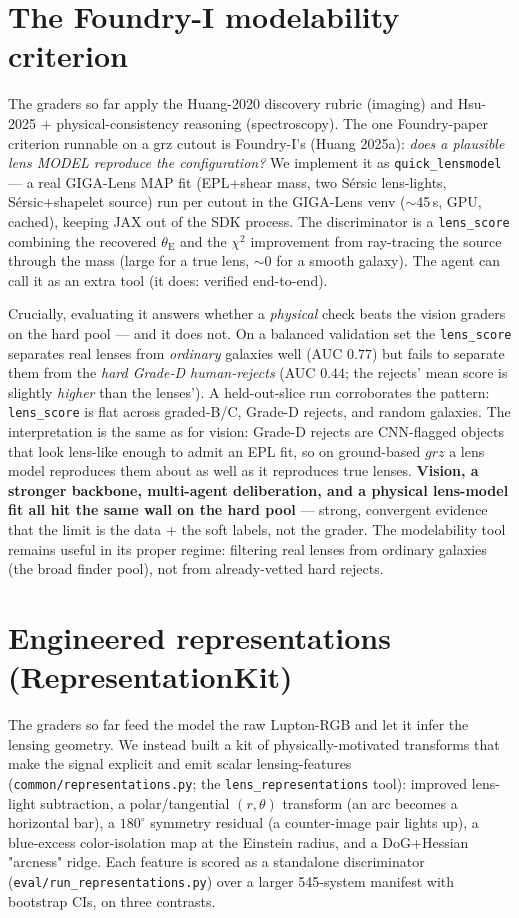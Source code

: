\documentclass[11pt,letterpaper]{article}
\newcommand{\thetaE}{\ensuremath{\theta_{\mathrm{E}}}}
\newcommand{\modelAUCrand}{0.77}     %
\newcommand{\modelAUCreject}{0.44}   %
\begin{document}
\section{The Foundry-I modelability criterion}
The graders so far apply the Huang-2020 discovery rubric (imaging) and Hsu-2025 +
physical-consistency reasoning (spectroscopy). The one Foundry-paper criterion runnable on
a grz cutout is Foundry-I's (Huang 2025a): \emph{does a plausible lens MODEL reproduce the
configuration?} We implement it as \texttt{quick\_lensmodel} --- a real GIGA-Lens MAP fit
(EPL+shear mass, two S\'ersic lens-lights, S\'ersic+shapelet source) run per cutout in the
GIGA-Lens venv ($\sim$45\,s, GPU, cached), keeping JAX out of the SDK process. The
discriminator is a \texttt{lens\_score} combining the recovered \thetaE{} and the $\chi^2$
improvement from ray-tracing the source through the mass (large for a true lens, $\sim$0 for
a smooth galaxy). The agent can call it as an extra tool (it does: verified end-to-end).

Crucially, evaluating it answers whether a \emph{physical} check beats the vision graders on
the hard pool --- and it does not. On a balanced validation set the \texttt{lens\_score}
separates real lenses from \emph{ordinary} galaxies well (AUC $\modelAUCrand$) but fails to
separate them from the \emph{hard Grade-D human-rejects} (AUC $\modelAUCreject$; the rejects'
mean score is slightly \emph{higher} than the lenses'). A held-out-slice run corroborates the
pattern: \texttt{lens\_score} is flat across graded-B/C, Grade-D rejects, and random galaxies.
The interpretation is the same as for vision: Grade-D rejects are CNN-flagged objects that
look lens-like enough to admit an EPL fit, so on ground-based $grz$ a lens model reproduces
them about as well as it reproduces true lenses. \textbf{Vision, a stronger backbone,
multi-agent deliberation, and a physical lens-model fit all hit the same wall on the hard
pool} --- strong, convergent evidence that the limit is the data + the soft labels, not the
grader. The modelability tool remains useful in its proper regime: filtering real lenses from
ordinary galaxies (the broad finder pool), not from already-vetted hard rejects.

\section{Engineered representations (RepresentationKit)}
The graders so far feed the model the raw Lupton-RGB and let it infer the lensing geometry.
We instead built a kit of physically-motivated transforms that make the signal explicit and
emit scalar lensing-features (\texttt{common/representations.py}; the \texttt{lens\_representations}
tool): improved lens-light subtraction, a polar/tangential $(r,\theta)$ transform (an arc
becomes a horizontal bar), a $180^\circ$ symmetry residual (a counter-image pair lights up), a
blue-excess color-isolation map at the Einstein radius, and a DoG+Hessian "arcness" ridge. Each
feature is scored as a standalone discriminator (\texttt{eval/run\_representations.py}) over a
larger 545-system manifest with bootstrap CIs, on three contrasts.
\end{document}
